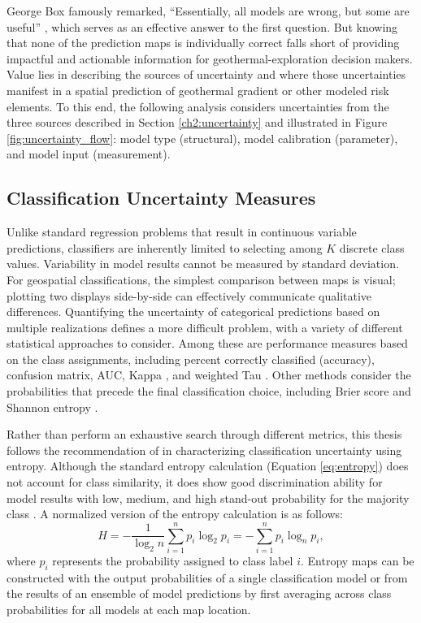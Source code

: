 George Box famously remarked, ``Essentially, all models are wrong, but some are useful'' \citep{box_empirical_1987}, which serves as an effective answer to the first question. But knowing that none of the prediction maps is individually correct falls short of providing impactful and actionable information for geothermal-exploration decision makers. Value lies in describing the sources of uncertainty and where those uncertainties manifest in a spatial prediction of geothermal gradient or other modeled risk elements. To this end, the following analysis considers uncertainties from the three sources described in Section \ref{ch2:uncertainty} and illustrated in Figure \ref{fig:uncertainty_flow}: model type (structural), model calibration (parameter), and model input (measurement).

\subsection{Classification Uncertainty Measures}\label{ch3:uncertainty_measures}

Unlike standard regression problems that result in continuous variable predictions, classifiers are inherently limited to selecting among $K$ discrete class values. Variability in model results cannot be measured by standard deviation. For geospatial classifications, the simplest comparison between maps is visual; plotting two displays side-by-side can effectively communicate qualitative differences. Quantifying the uncertainty of categorical predictions based on multiple realizations defines a more difficult problem, with a variety of different statistical approaches to consider. Among these are performance measures based on the class assignments, including percent correctly classified (accuracy), confusion matrix, AUC, Kappa \citep{cohen_coefficient_1960}, and weighted Tau \citep{ma_tau_1995}. Other methods consider the probabilities that precede the final classification choice, including Brier score \citep{brier_verification_1950} and Shannon entropy \citep{shannon_mathematical_1948}.

Rather than perform an exhaustive search through different metrics, this thesis follows the recommendation of \citet{beaudette_accuracy_2020} in characterizing classification uncertainty using entropy. Although the standard entropy calculation (Equation \ref{eq:entropy}) does not account for class similarity, it does show good discrimination ability for model results with low, medium, and high stand-out probability for the majority class \citep{beaudette_accuracy_2020}. A normalized version of the entropy calculation is as follows:
\begin{equation}
\label{eq:norm_entropy}
    H = -\frac{1}{\log_2{n}}\sum_{i=1}^{n}{p_i \log_2{p_i}} = -\sum_{i=1}^{n}{p_i \log_n{p_i}},
\end{equation}
where $p_i$ represents the probability assigned to class label $i$. Entropy maps can be constructed with the output probabilities of a single classification model or from the results of an ensemble of model predictions by first averaging across class probabilities for all models at each map location.


